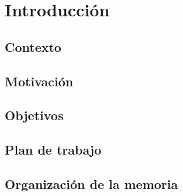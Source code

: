 \chapter{Introducción}
\label{cap:introduccion}



\section{Contexto}




\section{Motivación}




\section{Objetivos}



\section{Plan de trabajo}



\section{Organizaci\'on de la memoria}